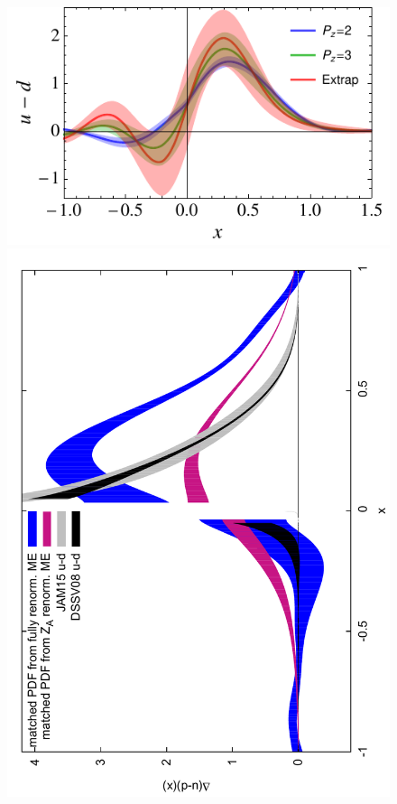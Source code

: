 %
%


\begin{figure}[t]
\centering
\includegraphics[width=.6\textwidth]{plots/pdf_nonorm}
\includegraphics[scale=0.4,angle=-90]{plots/qmatched_bare_vs_fit69v2}\,\,\,

\end{figure}
